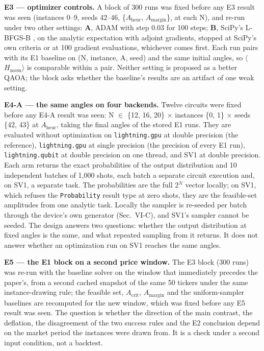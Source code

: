 \documentclass{ieeeaccess}
\begin{document}
\textbf{E3 --- optimizer controls.} A block of 300 runs was fixed before any E3 result was seen (instances 0--9, seeds 42--46, \{$A_{\mathrm{heur}}$, $A_{\mathrm{margin}}$\}, at each N), and re-run under two other settings: \textbf{A}, ADAM with step 0.03 for 100 steps; \textbf{B}, SciPy's L-BFGS-B \cite{ref46}, \cite{ref47} on the analytic expectation with adjoint gradients, stopped at SciPy's own criteria or at 100 gradient evaluations, whichever comes first. Each run pairs with its E1 baseline on (N, instance, A, seed) and the same initial angles, so $\langle$$H_{\mathrm{norm}}$$\rangle$ is comparable within a pair. Neither setting is proposed as a better QAOA; the block asks whether the baseline's results are an artifact of one weak setting.


\textbf{E4-A --- the same angles on four backends.} Twelve circuits were fixed before any E4-A result was seen: N $\in$ \{12, 16, 20\} $\times$ instances \{0, 1\} $\times$ seeds \{42, 43\} at $A_{\mathrm{heur}}$, taking the final angles of the stored E1 runs. They are evaluated without optimization on \texttt{lightning.gpu} at double precision (the reference), \texttt{lightning.gpu} at single precision (the precision of every E1 run), \texttt{lightning.qubit} at double precision on one thread, and SV1 at double precision. Each arm returns the exact probabilities of the output distribution and 10 independent batches of 1,000 shots, each batch a separate circuit execution and, on SV1, a separate task. The probabilities are the full 2$^{N}$ vector locally; on SV1, which refuses the \texttt{Probability} result type at zero shots, they are the feasible-set amplitudes from one analytic task. Locally the sampler is re-seeded per batch through the device's own generator (Sec.~VI-C), and SV1's sampler cannot be seeded. The design answers two questions: whether the output distribution at fixed angles is the same, and what repeated sampling from it returns. It does not answer whether an optimization run on SV1 reaches the same angles.


\textbf{E5 --- the E1 block on a second price window.} The E3 block (300 runs) was re-run with the baseline solver on the window that immediately precedes the paper's, from a second cached snapshot of the same 50 tickers under the same instance-drawing rule; the feasible set, $A_{\mathrm{crit}}$, $A_{\mathrm{margin}}$ and the uniform-sampler baselines are recomputed for the new window, which was fixed before any E5 result was seen. The question is whether the direction of the main contrast, the deflation, the disagreement of the two success rules and the E2 conclusion depend on the market period the instances were drawn from. It is a check under a second input condition, not a backtest.
\end{document}
